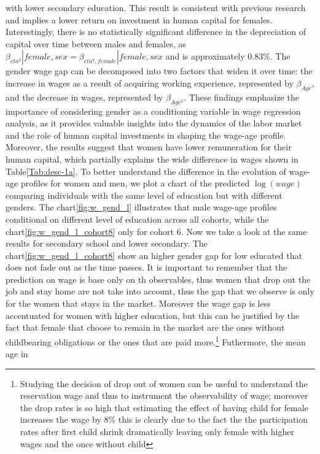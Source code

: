 \documentclass[12pt]{article}
\begin{document}
with lower secondary education. This result is consistent with previous research \citet{erosa2012human} and implies a
lower return on investment in human capital for females.
Interestingly, there is no statistically significant difference in the depreciation of capital over time between males and females, as $\beta_{eta^2}|female,sex = \beta_{eta^2, female}|female,sex$ and is approximately $0.83\%$.
\newline
The gender wage gap can be decomposed into two factors that widen it over time: the increase in wages as a result of acquiring working experience, represented by $\beta_{Age}$, and the decrease in wages, represented by $\beta_{Age^2}$.
\newline
These findings emphasize the importance of considering gender as a conditioning variable in wage regression analysis, as
it provides valuable insights into the dynamics of the labor market and the role of human capital investments in shaping
the wage-age profile. Moreover, the results suggest that women have lower remuneration for their human capital, which
partially explains the wide difference in wages shown in Table\ref{Tab:desc-1a}.
To better understand the difference in the evolution of wage-age profiles for women and men, we plot a chart of the
predicted $\log(wage)$ comparing individuals with the same level of education but with different genders.
\newline
The chart\ref{fig:w_gend_l} illustrates that male wage-age profiles conditional on different level of education across
all cohorts, while the chart\ref{fig:w_gend_l_cohort8} only for cohort 6. Now we take a look at the same results for
secondary school and lower secondary. 
\newline
The chart\ref{fig:w_gend_l_cohort8} show an higher gender gap for low educated that does not fade out as the time
passes. It is important to remember that the prediction on wage is base only on th observables, thus  women that drop
out the job and stay home are not take into account, thus the gap that we observe is only for the women that stays in
the market. Moreover the wage gap is less accentuated for women with higher education, but this can be justified by the
fact that female that choose to remain in the market are the ones without childbearing obligations or the ones that are
paid more.\footnote{Studying the decision of drop out of women can be useful to understand the reservation wage and
thus to instrument the observability of wage; moreover the drop rates is so high that estimating the effect of having
child for female increases the wage by 8\% this is clearly due to the fact the the participation rates after first child
shrink dramatically leaving only female with higher wages and the once without child } Futhermore, the mean age in
\end{document}
